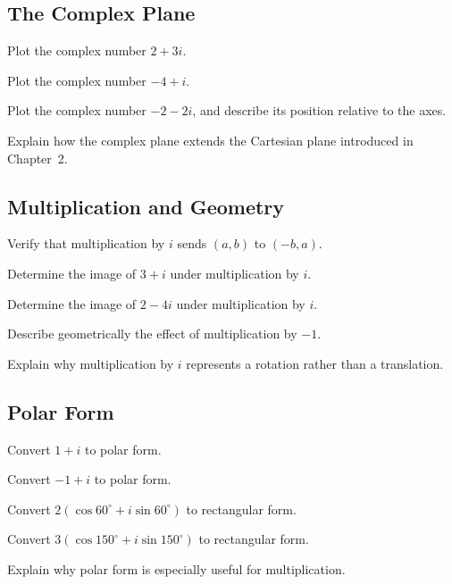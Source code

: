 \subsection*{The Complex Plane}
\begin{exercise}
Plot the complex number $2+3i$.
\end{exercise}
\begin{exercise}
Plot the complex number $-4+i$.
\end{exercise}
\begin{exercise}
Plot the complex number $-2-2i$, and describe its position relative to
the axes.
\end{exercise}
\begin{exercise}
Explain how the complex plane extends the Cartesian plane introduced in
Chapter~2.
\end{exercise}

\subsection*{Multiplication and Geometry}
\begin{exercise}
Verify that multiplication by $i$ sends $(a,b)$ to $(-b,a)$.
\end{exercise}
\begin{exercise}
Determine the image of $3+i$ under multiplication by $i$.
\end{exercise}
\begin{exercise}
Determine the image of $2-4i$ under multiplication by $i$.
\end{exercise}
\begin{exercise}
Describe geometrically the effect of multiplication by $-1$.
\end{exercise}
\begin{exercise}
Explain why multiplication by $i$ represents a rotation rather than a
translation.
\end{exercise}

\subsection*{Polar Form}
\begin{exercise}
Convert $1+i$ to polar form.
\end{exercise}
\begin{exercise}
Convert $-1+i$ to polar form.
\end{exercise}
\begin{exercise}
Convert $2(\cos60^\circ+i\sin60^\circ)$ to rectangular form.
\end{exercise}
\begin{exercise}
Convert $3(\cos150^\circ+i\sin150^\circ)$ to rectangular form.
\end{exercise}
\begin{exercise}
Explain why polar form is especially useful for multiplication.
\end{exercise}

